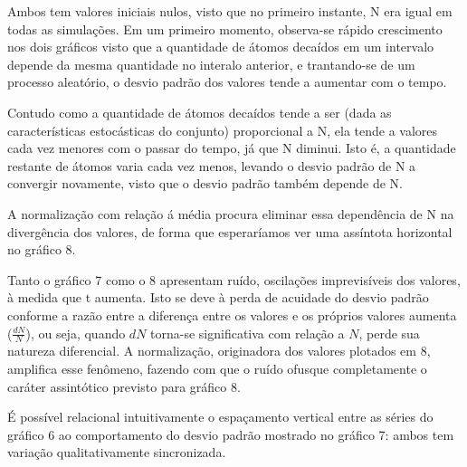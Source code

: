 \documentclass{article}
\begin{document}
Ambos tem valores iniciais nulos, visto que no primeiro instante, N era igual em todas as simulações. Em um primeiro momento, observa-se rápido crescimento nos dois gráficos visto que a quantidade de átomos decaídos em um intervalo depende da mesma quantidade no interalo anterior, e trantando-se de um processo aleatório, o desvio padrão dos valores tende a aumentar com o tempo.\par
Contudo como a quantidade de átomos decaídos tende a ser (dada as características estocásticas do conjunto) proporcional a N, ela tende a valores cada vez menores com o passar do tempo, já que N diminui. Isto é, a quantidade restante de átomos varia cada vez menos, levando o desvio padrão de N a convergir novamente, visto que o desvio padrão também depende de N.\par
A normalização com relação á média procura eliminar essa dependência de N na divergência dos valores, de forma que esperaríamos ver uma assíntota horizontal no gráfico 8.\par

Tanto o gráfico 7 como o 8 apresentam ruído, oscilações imprevisíveis dos valores, à medida que t aumenta. Isto se deve à perda de acuidade do desvio padrão conforme a razão entre a diferença entre os valores e os próprios valores aumenta ($\frac{dN}{N}$), ou seja, quando $dN$ torna-se significativa com relação a $N$, perde sua natureza diferencial. A normalização, originadora dos valores plotados em 8, amplifica esse fenômeno, fazendo com que o ruído ofusque completamente o caráter assintótico previsto para gráfico 8.\par

É possível relacional intuitivamente o espaçamento vertical entre as séries do gráfico 6 ao comportamento do desvio padrão mostrado no gráfico 7: ambos tem variação qualitativamente sincronizada.\par
\end{document}
